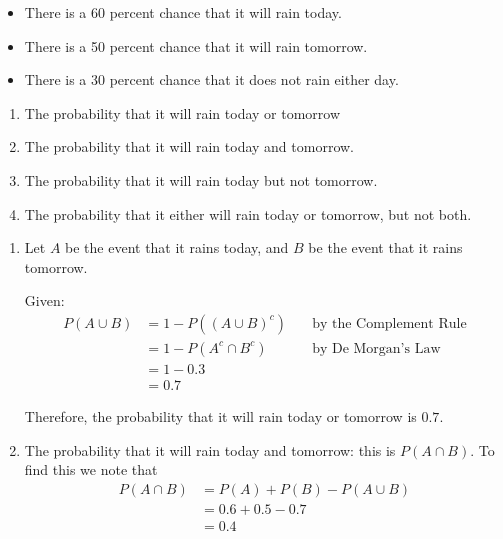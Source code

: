 \begin{example}
    \begin{itemize}
    \item There is a 60 percent chance that it will rain today.
    \item There is a 50 percent chance that it will rain tomorrow.
    \item There is a 30 percent chance that it does not rain either day.
    \end{itemize}

\begin{enumerate}[label=(\alph*)]
    \item The probability that it will rain today or tomorrow
    \item The probability that it will rain today and tomorrow.
    \item The probability that it will rain today but not tomorrow.
    \item The probability that it either will rain today or tomorrow, but not both.
\end{enumerate}

\begin{solution}
\begin{enumerate}[label=(\alph*)]
    \item     Let \( A \) be the event that it rains today, and \( B \) be the event that it rains tomorrow.

    Given:
    \begin{align*}
        P(A \cup B) &= 1 - P\left((A \cup B)^c\right) \quad &\text{by the Complement Rule} \\
                &= 1 - P\left(A^c \cap B^c\right) \quad &\text{by De Morgan's Law} \\
                &= 1 - 0.3 \\
                &= 0.7
    \end{align*}


    Therefore, the probability that it will rain today or tomorrow is \( 0.7 \).

    \item The probability that it will rain today and tomorrow: this is $P(A \cap B)$. To find this we note that
    \begin{align*}
    P(A \cap B) &= P(A) + P(B) - P(A \cup B) \\
                &= 0.6 + 0.5 - 0.7 \\
                &= 0.4
    \end{align*}


\end{enumerate}
\end{solution}
\end{example}
